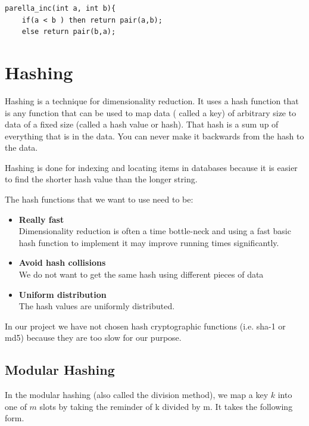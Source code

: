 \documentclass[12pt]{article}
\begin{document}
\begin{lstlisting}
parella_inc(int a, int b){
	if(a < b ) then return pair(a,b);
	else return pair(b,a);
 \end{lstlisting}
 
\section{Hashing}

Hashing is a technique for dimensionality reduction. It uses a hash function that is any function that can be used to map data ( called a key) of arbitrary size to data of a fixed size (called a hash value or hash). That hash is a sum up of everything that is in the data. You can never make it backwards from the hash to the data.

Hashing is done for indexing and locating items in databases because it is easier to find the shorter hash value than the longer string.

The hash functions that we want to use need to be: 

\begin{itemize}
\item \textbf{Really fast}\\
Dimensionality reduction is often a time bottle-neck and using a fast basic hash function to implement it may improve running times significantly. 
\item \textbf{Avoid hash collisions}\\
We do not want to get the same hash using different pieces of data %
\item \textbf{Uniform distribution}\\
The hash values are uniformly distributed.

\end{itemize}

In our project we have not chosen hash cryptographic functions (i.e. sha-1 or md5) because they are too slow for our purpose.

\subsection{Modular Hashing}

In the modular hashing (also called the division method), we map a key $k$ into one of $m$ slots by taking the reminder of k divided by m. It takes the following form. 
\end{document}
